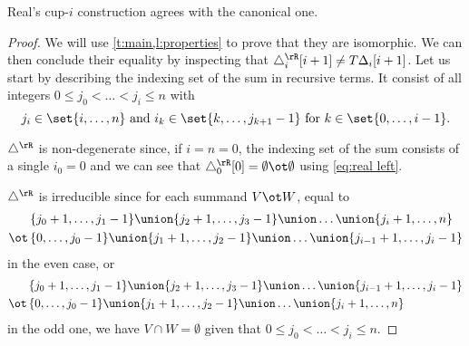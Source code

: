 \begin{theorem}
	Real's \mbox{cup-$i$} construction agrees with the canonical one.
\end{theorem}

\begin{proof}
	We will use \cref{t:main,l:properties} to prove that they are isomorphic.
	We can then conclude their equality by inspecting that $\triangle^\rR_i [i+1] \neq T \Delta_i [i+1]$.
	Let us start by describing the indexing set of the sum in recursive terms.
	It consist of all integers $0 \leq j_0 < \dots < j_i \leq n$ with
	\begin{equation}\label{eq:indexing set recursively}
		j_i \in \set{i,\dots,n} \text{ and }
		i_k \in \set{k,\dots,j_{k+1}-1} \text{ for } k \in \set{0,\dots,i-1}.
	\end{equation}

	$\triangle^\rR$ is non-degenerate since, if $i=n=0$, the indexing set of the sum consists of a single $i_0 = 0$ and we can see that $\triangle^\rR_0 [0] = \emptyset \ot \emptyset$ using \cref{eq:real left}.

	$\triangle^\rR$ is irreducible since for each summand $V \ot W$, equal to
	\begin{align*}
		&\{j_0+1,\dots,j_1-1\} \union \{j_2+1,\dots,j_3-1\} \union \dots \union \{j_i+1,\dots,n\} \\ \ot \,
		&\{0,\dots,j_0-1\} \union \{j_1+1,\dots,j_2-1\} \union \dots \union \{j_{i-1}+1,\dots,j_i-1\}
	\end{align*}
	in the even case, or
	\begin{align*}
		&\{j_0+1,\dots,j_1-1\} \union \{j_2+1,\dots,j_3-1\} \union \dots \union \{j_{i-1}+1,\dots,j_i-1\} \\ \ot \,
		&\{0,\dots,j_0-1\} \union \{j_1+1,\dots,j_2-1\} \union \dots \union \{j_i+1,\dots,n\}
	\end{align*}
	in the odd one, we have $V \cap W = \emptyset$ given that $0 \leq j_0 < \dots < j_i \leq n$.


\end{proof}
